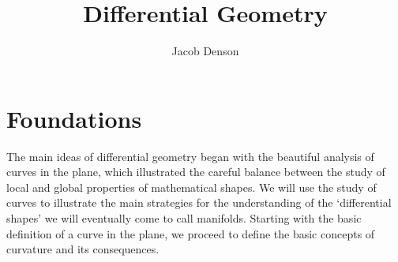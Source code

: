 

\title{Differential Geometry}
\author{Jacob Denson}



\maketitle
\tableofcontents
{}

\part{Foundations}

The main ideas of differential geometry began with the beautiful analysis of curves in the plane, which illustrated the careful balance between the study of local and global properties of mathematical shapes. We will use the study of curves to illustrate the main strategies for the understanding of the `differential shapes' we will eventually come to call manifolds. Starting with the basic definition of a curve in the plane, we proceed to define the basic concepts of curvature and its consequences.

